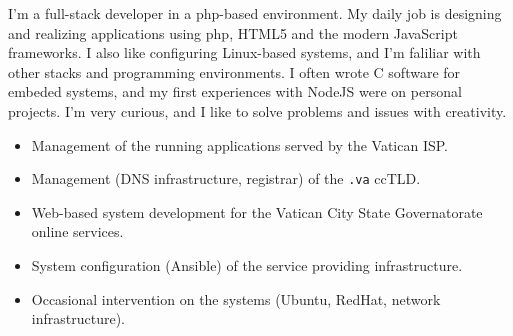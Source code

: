 \documentclass[10pt,a4paper]{altacv}
\begin{document}

\begin{fullwidth}
\makecvheader
\end{fullwidth}

I'm a full-stack developer in a php-based environment. My daily job is designing and realizing applications using php, HTML5 and the modern JavaScript frameworks. I also like configuring Linux-based systems, and I'm faliliar with other stacks and programming environments. I often wrote C software for embeded systems, and my first experiences with NodeJS were on personal projects. I'm very curious, and I like to solve problems and issues with creativity.


\begin{itemize}
\item Management of the running applications served by the Vatican ISP.
\item Management (DNS infrastructure, registrar) of the \texttt{.va} ccTLD.
\item Web-based system development for the Vatican City State Governatorate online services.
\item System configuration (Ansible) of the service providing infrastructure.
\item Occasional intervention on the systems (Ubuntu, RedHat, network infrastructure).
\end{itemize}

\divider
\end{document}

